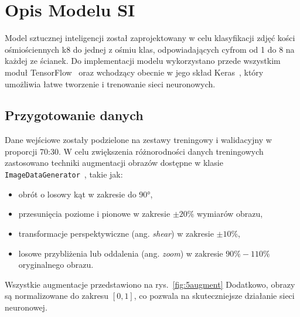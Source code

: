 \section{Opis Modelu SI}\label{sec:opis-modelu-si}

Model sztucznej inteligencji został zaprojektowany w celu klasyfikacji zdjęć kości ośmiościennych k8 do jednej z ośmiu klas,
odpowiadających cyfrom od 1 do 8 na każdej ze ścianek.
Do implementacji modelu wykorzystano przede wszystkim moduł TensorFlow~\cite{tensorflow_docs}
oraz wchodzący obecnie w jego skład Keras~\cite{keras_docs},
który umożliwia łatwe tworzenie i trenowanie sieci neuronowych.

\subsection{Przygotowanie danych}\label{subsec:przygotowanie-danych}

Dane wejściowe zostały podzielone na zestawy treningowy i walidacyjny w proporcji 70:30.
W celu zwiększenia różnorodności danych treningowych zastosowano techniki augmentacji obrazów dostępne w klasie
\texttt{ImageDataGenerator}~\cite{keras_imagedatagenerator}, takie jak:

\begin{itemize}
    \item obrót o losowy kąt w zakresie do 90°,
    \item przesunięcia poziome i pionowe w zakresie $\pm 20\%$ wymiarów obrazu,
    \item transformacje perspektywiczne (ang. \textit{shear}) w zakresie $\pm 10\%$,
    \item losowe przybliżenia lub oddalenia (ang. \textit{zoom}) w zakresie $90\%-110\%$ oryginalnego obrazu.
\end{itemize}

Wszystkie augmentacje przedstawiono na rys.~\ref{fig:5augment}
Dodatkowo, obrazy są normalizowane do zakresu $[0, 1]$, co pozwala na skuteczniejsze działanie sieci neuronowej.

